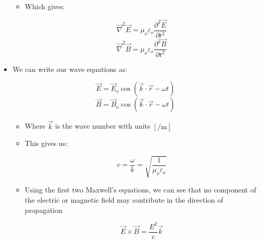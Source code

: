 \begin{itemize}
\begin{itemize}
      \item Which gives:

    $$\vec{\nabla}^2\vec{E}=\mu_o\varepsilon_o\frac{\partial^2 \vec{E}}{\partial t^2}$$
    $$\vec{\nabla}^2\vec{B}=\mu_o\varepsilon_o\frac{\partial^2\vec{B}}{\partial t^2}$$

    \end{itemize}

  \item We can write our wave equations as:

    $$\vec{E}=\vec{E}_o\cos(\vec{k}\cdot\vec{r}-\omega t)$$
    $$\vec{B}=\vec{B}_o\cos(\vec{k}\cdot\vec{r}-\omega t)$$

    \begin{itemize}

      \item Where $\vec{k}$ is the wave number with units $[\si{\per\meter}]$

      \item This gives us:

        $$v=\frac{\omega}{k}=\sqrt{\frac{1}{\mu_o\varepsilon_o}}$$

      \item Using the first two Maxwell's equations, we can see that no component of the electric or magnetic field may contribute in the direction of propagation

        $$\vec{E}\times\vec{B}=\frac{E^2}{c}\vec{k}$$

    \end{itemize}

\end{itemize}



